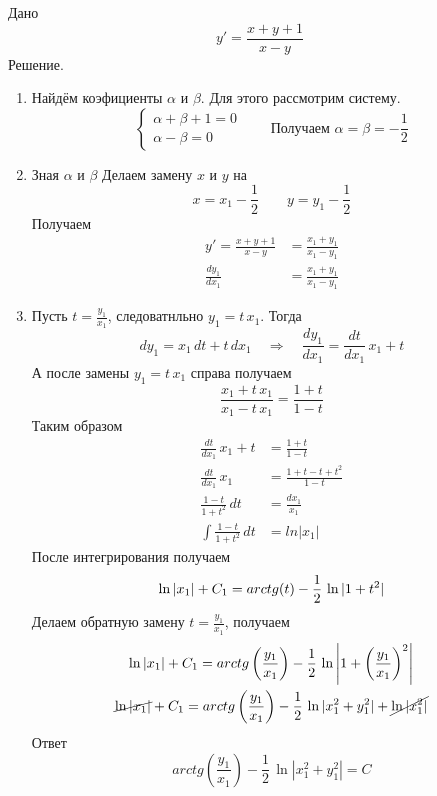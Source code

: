 \begin{Example}
    Дано
    \[
        y' = \frac{x + y + 1}{x - y}
    \]
    Решение.
    \begin{enumerate}
        \item Найдём коэфициенты $\alpha$ и $\beta$. Для этого рассмотрим систему.
        \[
            \begin{cases}
                \alpha + \beta + 1 = 0\\
                \alpha - \beta = 0
            \end{cases} \qquad \text{Получаем } \alpha = \beta = -\frac{1}{2}
        \]
        
        \item Зная $\alpha$ и $\beta$ Делаем замену $x$ и $y$ на
        \[
            x = x_1 - \frac{1}{2} \qquad y = y_1 - \frac{1}{2}
        \]
        Получаем
        \begin{align*}
            y' = \frac{x + y + 1}{x - y} &= \frac{x_1 + y_1}{x_1 - y_1}\\
            \frac{dy_1}{dx_1} &= \frac{x_1 + y_1}{x_1 - y_1}
        \end{align*}
        
        \item Пусть $t = \frac{y_1}{x_1}$, следоватнльно $y_1 = t\,x_1$. Тогда 
        \[
            dy_1 = x_1\,dt + t\,dx_1 \quad \Rightarrow \quad \frac{dy_1}{dx_1} = \frac{dt}{dx_1}\,x_1 + t
        \]
        А после замены $y_1 = t\,x_1$ справа получаем
        \[
            \frac{x_1 + t\,x_1}{x_1 - t\,x_1} = \frac{1 + t}{1 - t}
        \]
        Таким образом
        \begin{align*}
            \frac{dt}{dx_1}\,x_1 + t &= \frac{1 + t}{1 - t}\\
            \frac{dt}{dx_1}\,x_1 &= \frac{1 + t - t + t^2}{1 - t}\\
            \frac{1 - t}{1 + t^2}\,dt &= \frac{dx_1}{x_1}\\
            \int \frac{1 - t}{1 + t^2}\,dt &= ln|x_1|
        \end{align*}
        После интегрирования получаем
        \[
            \ln|x_1| + C_1 = arctg(t) - \frac{1}{2}\,\ln|1 + t^2|\\
        \]
        Делаем обратную замену $t = \frac{y_1}{x_1}$, получаем
        \begin{gather*}
            \ln|x_1| + C_1 = arctg\left(\frac{y_1}{x_1}\right) - \frac{1}{2}\,\ln\left|1 + \left(\frac{y_1}{x_1}\right)^2\right|\\
            \cancel{\ln|x_1|} + C_1 = arctg\left(\frac{y_1}{x_1}\right) - \frac{1}{2}\,\ln|x_1^2 + y_1^2| + \cancel{\ln|x_1^2|}\\
        \end{gather*}
        Ответ
        \[
            arctg\left(\frac{y_1}{x_1}\right) - \frac{1}{2}\,\ln|x_1^2 + y_1^2| = C
        \]
    \end{enumerate}
\end{Example}